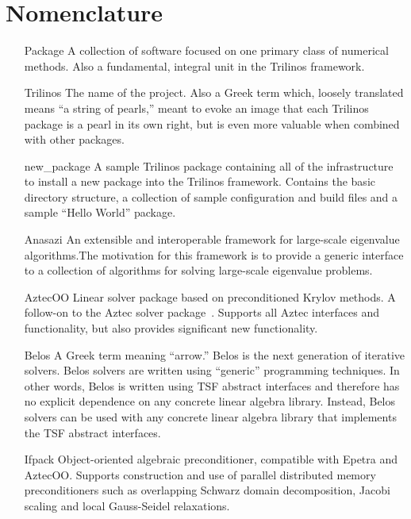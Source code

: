 \documentclass[12pt,relax]{TrilinosDevGuide}
\begin{document}
\section*{Nomenclature}
\begin{itemize}

\item[Package]
A collection of software focused on one primary class of numerical
methods.  Also a fundamental, integral unit in the Trilinos framework.

\item[Trilinos]
The name of the project.  Also a Greek term which,
loosely translated means ``a string of pearls,'' 
meant to evoke an image that each Trilinos package is a pearl in its 
own right, but is even more valuable when combined with other 
packages.

\item[new\_package] A sample Trilinos package containing all of the
infrastructure to install a new package into the Trilinos framework.
Contains the basic directory structure, a collection of sample
configuration and build files and a sample ``Hello World'' package.

\item[Anasazi]
An extensible and interoperable framework for large-scale eigenvalue
algorithms.The motivation for this framework is to provide a generic
interface to a collection of algorithms for solving large-scale 
eigenvalue problems.

\item[AztecOO] 
Linear solver package based on preconditioned Krylov methods.  A 
follow-on to the Aztec solver package~\cite{Aztec2.1}.  
Supports all Aztec 
interfaces and functionality, but also provides significant new 
functionality.

\item[Belos] A Greek term meaning ``arrow.'' Belos is the next
generation of iterative solvers.  Belos solvers are written using
``generic'' programming techniques.  In other words, Belos is written
using TSF abstract interfaces and therefore has no explicit dependence
on any concrete linear algebra library.  Instead, Belos solvers can be
used with any concrete linear algebra library that implements the TSF
abstract interfaces. 

\item[Ifpack] 
Object-oriented algebraic preconditioner, compatible with 
Epetra and AztecOO.  Supports construction and use of parallel
distributed memory preconditioners such as overlapping Schwarz domain
decomposition, Jacobi scaling and local Gauss-Seidel relaxations.


\end{itemize}
\end{document}

